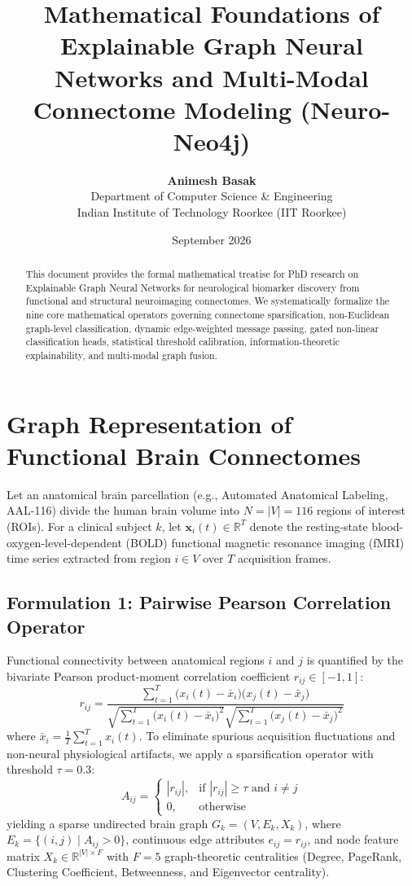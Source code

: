 \documentclass[11pt,a4paper]{article}
\title{\textbf{Mathematical Foundations of Explainable Graph Neural Networks and Multi-Modal Connectome Modeling (Neuro-Neo4j)}}
\author{\textbf{Animesh Basak} \\ Department of Computer Science \& Engineering \\ Indian Institute of Technology Roorkee (IIT Roorkee)}
\date{September 2026}
\begin{document}
\maketitle

\begin{abstract}
This document provides the formal mathematical treatise for PhD research on Explainable Graph Neural Networks for neurological biomarker discovery from functional and structural neuroimaging connectomes. We systematically formalize the nine core mathematical operators governing connectome sparsification, non-Euclidean graph-level classification, dynamic edge-weighted message passing, gated non-linear classification heads, statistical threshold calibration, information-theoretic explainability, and multi-modal graph fusion.
\end{abstract}

\section{Graph Representation of Functional Brain Connectomes}

Let an anatomical brain parcellation (e.g., Automated Anatomical Labeling, AAL-116) divide the human brain volume into $N = |V| = 116$ regions of interest (ROIs). For a clinical subject $k$, let $\bm{x}_i(t) \in \mathbb{R}^T$ denote the resting-state blood-oxygen-level-dependent (BOLD) functional magnetic resonance imaging (fMRI) time series extracted from region $i \in V$ over $T$ acquisition frames.

\subsection{Formulation 1: Pairwise Pearson Correlation Operator}
Functional connectivity between anatomical regions $i$ and $j$ is quantified by the bivariate Pearson product-moment correlation coefficient $r_{ij} \in [-1, 1]$:
\begin{equation}
r_{ij} = \frac{\sum_{t=1}^T \big(x_i(t) - \bar{x}_i\big)\big(x_j(t) - \bar{x}_j\big)}{\sqrt{\sum_{t=1}^T \big(x_i(t) - \bar{x}_i\big)^2} \sqrt{\sum_{t=1}^T \big(x_j(t) - \bar{x}_j\big)^2}}
\end{equation}
where $\bar{x}_i = \frac{1}{T}\sum_{t=1}^T x_i(t)$. To eliminate spurious acquisition fluctuations and non-neural physiological artifacts, we apply a sparsification operator with threshold $\tau = 0.3$:
\begin{equation}
A_{ij} = \begin{cases} 
|r_{ij}|, & \text{if } |r_{ij}| \ge \tau \text{ and } i \ne j \\ 
0, & \text{otherwise} 
\end{cases}
\end{equation}
yielding a sparse undirected brain graph $G_k = (V, E_k, X_k)$, where $E_k = \{(i, j) \mid A_{ij} > 0\}$, continuous edge attributes $e_{ij} = r_{ij}$, and node feature matrix $X_k \in \mathbb{R}^{|V| \times F}$ with $F=5$ graph-theoretic centralities (Degree, PageRank, Clustering Coefficient, Betweenness, and Eigenvector centrality).
\end{document}
